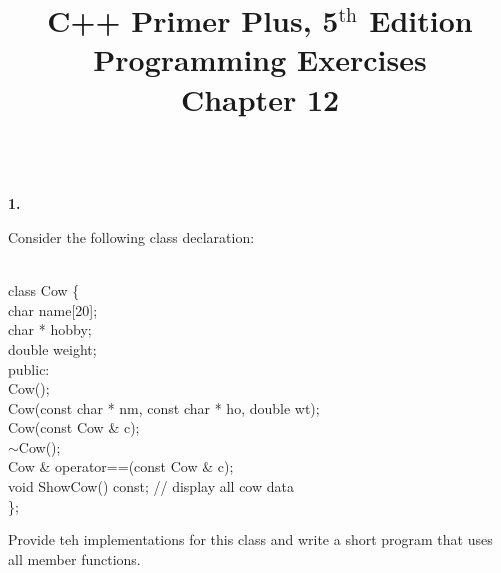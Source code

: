 \documentclass[10 pt]{amsart}
\newlength{\cwidth}
\newenvironment{cpart}[2][\cwidth]
	{%
		\\ %
		\textbf{#2. }%
		\begin{minipage}[t]{#1}%
		\setlength{\parindent}{0pt}%
		\setlength{\parskip}{2ex}%
	}
	{%
		\end{minipage}%
	}
\newcommand{\ChapNum}{12}
\begin{document}
	\title
	[Chapter \ChapNum]
	{C++ Primer Plus, 5$^\text{th}$ Edition \\
	Programming Exercises \\
	Chapter \ChapNum}

	\maketitle

	\begin{cpart}{1}
		Consider the following class declaration:
		{\ttfamily
			\begin{tabbing}
				\phantom{\qquad}\= \\
				class Cow \{ \\
				\> 	char name[20]; \\
				\> 	char * hobby; \\
				\> 	double weight; \\
				public: \\
				\> 	Cow(); \\	
				\> 	Cow(const char * nm, const char * ho, double wt); \\
				\> 	Cow(const Cow \& c); \\
				\> 	$\sim$Cow(); \\
				\> 	Cow \& operator==(const Cow \& c); \\
				\> 	void ShowCow() const; // display all cow data \\
				\}; 
			\end{tabbing}
		}
		Provide teh implementations for this class and write a short
		program that uses all member functions.
	\end{cpart}
	\newpage
\end{document}
